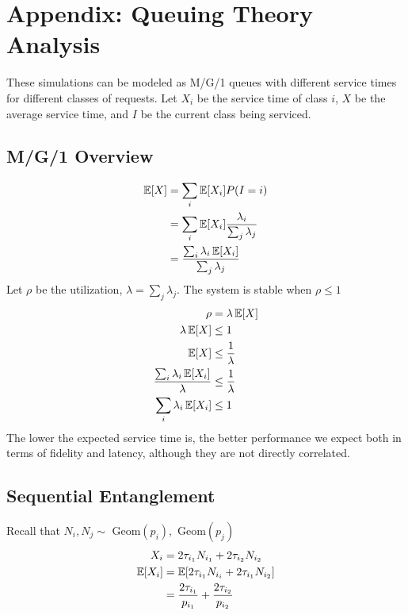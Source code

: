 \section{Appendix: Queuing Theory Analysis}
These simulations can be modeled as M/G/1 queues with different service times for different classes of requests.
Let $X_i$ be the service time of class $i$, $X$ be the average service time, and $I$ be the current class being serviced.
\subsection{M/G/1 Overview}
\begin{align*}
    \operatorname*{\mathbb{E}}[X] & = \sum_{i}\operatorname*{\mathbb{E}}[X_i]P(I=i)                              \\
          & = \sum_{i}\operatorname*{\mathbb{E}}[X_i]\frac{\lambda_i}{\sum_{j}\lambda_j} \\
          & = \frac{\sum_{i}\lambda_i\operatorname*{\mathbb{E}}[X_i]}{\sum_{j}\lambda_j}
\end{align*}
Let $\rho$ be the utilization, $\lambda = \sum_{j}\lambda_j$. The system is stable when $\rho \leq 1$
\begin{align*}
    \rho                                     & = \lambda\operatorname*{\mathbb{E}}[X]         \\
    \lambda\operatorname*{\mathbb{E}}[X]                             & \leq 1                 \\
    \operatorname*{\mathbb{E}}[X]                                    & \leq \frac{1}{\lambda} \\
    \frac{\sum_{i}\lambda_i\operatorname*{\mathbb{E}}[X_i]}{\lambda} & \leq \frac{1}{\lambda} \\
    \sum_{i}\lambda_i\operatorname*{\mathbb{E}}[X_i]                 & \leq 1
\end{align*}
The lower the expected service time is, the better performance we expect both in terms of fidelity and latency,
although they are not directly correlated.
\subsection{Sequential Entanglement}
Recall that $N_{i},N_{j} \sim \mbox{ Geom}(p_{i}),\mbox{ Geom}(p_{j})$
\begin{align*}
    X_i     & = 2\tau_{i_1}N_{i_1}+ 2\tau_{i_2}N_{i_2}                    \\
    \operatorname*{\mathbb{E}}[X_i] & = \operatorname*{\mathbb{E}}[2\tau_{i_1}N_{i_i}+2\tau_{i_1}N_{i_2}]                 \\
            & = \frac{2\tau_{i_1}}{p_{i_1}} + \frac{2\tau_{i_2}}{p_{i_2}}
\end{align*}
